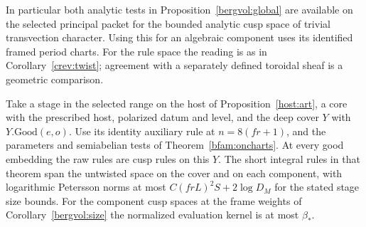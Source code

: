 In particular both analytic tests in
Proposition~\ref{bergvol:global} are available on the selected
principal packet for the bounded analytic cusp space of trivial
transvection character. Using this for an algebraic component
uses its identified framed period charts. For the rule space the
reading is as in Corollary~\ref{crev:twist}; agreement with a
separately defined toroidal sheaf is a geometric comparison.

\begin{corollary}\label{crev:good}
Take a stage in the selected range on the host of
Proposition~\ref{host:art}, a core with the prescribed host,
polarized datum and level, and the deep cover \(Y\) with
\(Y.\mathrm{Good}(e,o)\). Use its identity auxiliary rule
at \(n=8(fr+1)\), and the parameters and semiabelian tests of
Theorem~\ref{bfam:oncharts}. At every good embedding the raw
rules are cusp rules on this \(Y\). The short integral rules in
that theorem span the untwisted space on the cover and on each
component, with logarithmic Petersson norms at most
\(C(frL)^2S+2\log D_M\) for the stated stage size bounds.
For the component cusp spaces at the frame weights of
Corollary~\ref{bergvol:size} the normalized evaluation kernel
is at most \(\beta_*\).
\end{corollary}
